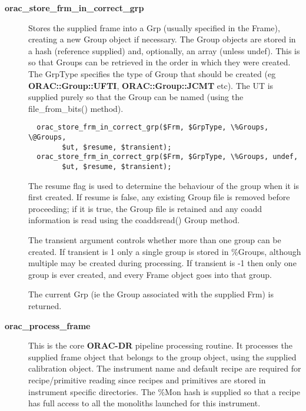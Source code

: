 \begin{description}

\item[{\textbf{orac\_store\_frm\_in\_correct\_grp}}] \mbox{}

Stores the supplied frame into a Grp (usually specified in the Frame),
creating a new Group object if necessary. The Group objects are stored
in a hash (reference supplied) and, optionally, an array (unless undef).
This is so that Groups can be retrieved in the order in which they
were created. The GrpType specifies the type of Group that should be
created (eg \textbf{ORAC::Group::UFTI}, \textbf{ORAC::Group::JCMT} etc). The UT
is supplied purely so that the Group can be named (using the
file\_from\_bits() method).

\begin{verbatim}
  orac_store_frm_in_correct_grp($Frm, $GrpType, \%Groups, \@Groups,
        $ut, $resume, $transient);
  orac_store_frm_in_correct_grp($Frm, $GrpType, \%Groups, undef,
        $ut, $resume, $transient);
\end{verbatim}


The resume flag is used to determine the behaviour of the group when
it is first created. If resume is false, any existing Group file is
removed before proceeding; if it is true, the Group file is retained
and any coadd information is read using the coaddsread() Group
method.



The transient argument controls whether more than one group can be
created. If transient is 1 only a single group is stored in \%Groups,
although multiple may be created during processing. If transient is -1
then only one group is ever created, and every Frame object goes into
that group.



The current Grp (ie the Group associated with the supplied Frm)
is returned.


\item[{\textbf{orac\_process\_frame}}] \mbox{}

This is the core \textbf{ORAC-DR} pipeline processing routine.
It processes the supplied frame object that belongs to the group object,
using the supplied calibration object. The instrument name and default
recipe are required for recipe/primitive reading since recipes and
primitives are stored in instrument specific directories.
The \%Mon hash is supplied so that a recipe has full access to
all the monoliths launched for this instrument.


\end{description}

